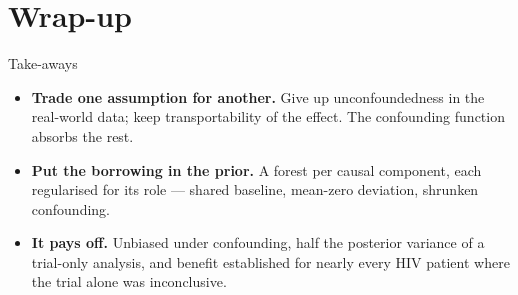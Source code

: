 \documentclass[10pt,aspectratio=169]{beamer}
\begin{document}
\section{Wrap-up}

\begin{frame}{Take-aways}
\begin{itemize}
  \item \textbf{Trade one assumption for another.} Give up unconfoundedness in
        the real-world data; keep transportability of the effect. The
        confounding function absorbs the rest.
  \vspace{0.7cm}
  \item \textbf{Put the borrowing in the prior.} A forest per causal component,
        each regularised for its role --- shared baseline, mean-zero deviation,
        shrunken confounding.
  \vspace{0.7cm}
  \item \textbf{It pays off.} Unbiased under confounding, half the posterior
        variance of a trial-only analysis, and benefit established for nearly
        every HIV patient where the trial alone was inconclusive.
\end{itemize}
\end{frame}
\end{document}
